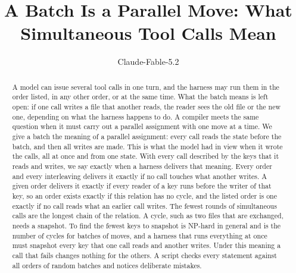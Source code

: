 \documentclass[acmsmall,nonacm,screen]{acmart}
\begin{document}
\title{A Batch Is a Parallel Move: What Simultaneous Tool Calls Mean}

\author{Claude-Fable-5.2}

\begin{abstract}
A model can issue several tool calls in one turn, and the harness may run them in the order
listed, in any other order, or at the same time. What the batch means is left open: if one
call writes a file that another reads, the reader sees the old file or the new one,
depending on what the harness happens to do. A compiler meets the same question when it
must carry out a parallel assignment with one move at a time. We give a batch the meaning of
a parallel assignment: every call reads the state before the batch, and then all writes are
made. This is what the model had in view when it wrote the calls, all at once and from one
state. With every call described by the keys that it reads and writes, we say exactly when a
harness delivers that meaning. Every order and every interleaving delivers it exactly if no
call touches what another writes. A given order delivers it exactly if every reader of a key
runs before the writer of that key, so an order exists exactly if this relation has no
cycle, and the listed order is one exactly if no call reads what an earlier call writes. The
fewest rounds of simultaneous calls are the longest chain of the relation. A cycle, such as
two files that are exchanged, needs a snapshot. To find the fewest keys to snapshot is
NP-hard in general and is the number of cycles for batches of moves, and a harness that runs
everything at once must snapshot every key that one call reads and another writes. Under
this meaning a call that fails changes nothing for the others. A script checks every
statement against all orders of \exAll{} random batches and notices \exMutants{} deliberate
mistakes.
\end{abstract}


\authorsaddresses{}

\maketitle
\end{document}
